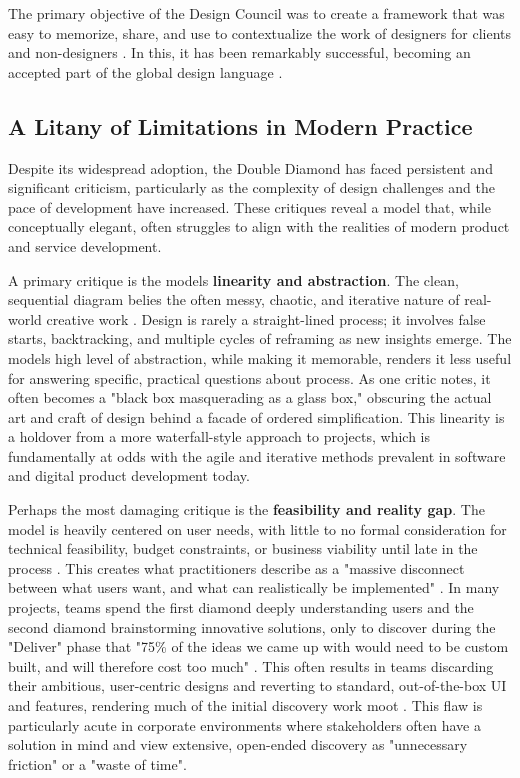 \documentclass[
  12pt,
  a4paper,
  bibliography=totoc,
  numbers=noenddot
]{scrartcl}
\begin{document}
The primary objective of the Design Council was to create a framework
that was easy to memorize, share, and use to contextualize the work of
designers for clients and non-designers \cite{designcouncil2025history}. In this, it
has been remarkably successful, becoming an accepted part of the global
design language \cite{designcouncil2025history}.

\subsection{A Litany of Limitations in
Modern
Practice}\label{a-litany-of-limitations-in-modern-practice}

Despite its widespread adoption, the Double Diamond has faced persistent
and significant criticism, particularly as the complexity of design
challenges and the pace of development have increased. These critiques
reveal a model that, while conceptually elegant, often struggles to
align with the realities of modern product and service development.

A primary critique is the model\textquotesingle s \textbf{linearity and
abstraction}. The clean, sequential diagram belies the often messy,
chaotic, and iterative nature of real-world creative
work \cite{medium2025double}. Design is rarely a straight-lined process; it
involves false starts, backtracking, and multiple cycles of reframing as
new insights emerge.\cite{danramsden2025limitations} The model\textquotesingle s
high level of abstraction, while making it memorable, renders it less
useful for answering specific, practical questions about process. As one
critic notes, it often becomes a "black box masquerading as a glass
box," obscuring the actual art and craft of design behind a facade of
ordered simplification.\cite{danramsden2025limitations} This linearity is a holdover
from a more waterfall-style approach to projects, which is fundamentally
at odds with the agile and iterative methods prevalent in software and
digital product development today.

Perhaps the most damaging critique is the \textbf{feasibility and
reality gap}. The model is heavily centered on user needs, with little
to no formal consideration for technical feasibility, budget
constraints, or business viability until late in the
process \cite{reddit2025double}. This creates what practitioners describe as
a "massive disconnect between what users want, and what can
realistically be implemented" \cite{reddit2025double}. In many projects,
teams spend the first diamond deeply understanding users and the second
diamond brainstorming innovative solutions, only to discover during the
"Deliver" phase that "75\% of the ideas we came up with would need to be
custom built, and will therefore cost too much" \cite{reddit2025double}.
This often results in teams discarding their ambitious, user-centric
designs and reverting to standard, out-of-the-box UI and features,
rendering much of the initial discovery work moot \cite{reddit2025double}.
This flaw is particularly acute in corporate environments where
stakeholders often have a solution in mind and view extensive,
open-ended discovery as "unnecessary friction" or a "waste of
time".\cite{smartinterface2025double}
\end{document}
